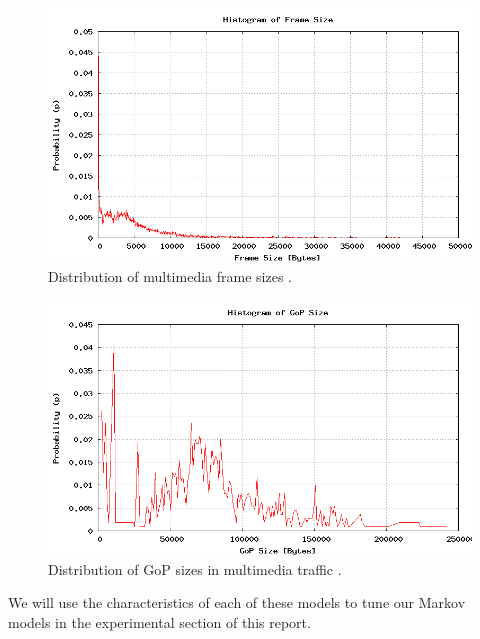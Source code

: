 \documentclass{llncs}
\begin{document}
\begin{figure}
\begin{center}
\includegraphics[scale=0.35]{frame.png}
\caption{Distribution of multimedia frame sizes \cite{sony-demo}.}
\label{fig:frame}
\end{center}
\end{figure}

\begin{figure}
\begin{center}
\includegraphics[scale=0.35]{gop.png}
\caption{Distribution of GoP sizes in multimedia traffic \cite{sony-demo}.}
\label{fig:gop}
\end{center}
\end{figure}

We will use the characteristics of each of these models to tune our Markov models in the experimental section of this report. 
\end{document}
